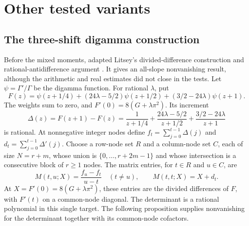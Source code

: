 \section{Other tested variants}\label{sec:variants}

\subsection{The three-shift digamma construction}

Before the mixed moments,  adapted Litsey's divided-difference
construction and rational-antidifference argument
\cite[Sections~3--6]{Litsey}. It gives an all-slope nonvanishing result,
although the arithmetic and real estimates did not close in the tests.
Let $\psi=\Gamma'/\Gamma$ be the digamma function. For rational
$\lambda$, put
\[
 F(z)=\psi(z+1/4)+(24\lambda-5/2)\psi(z+1/2)
                       +(3/2-24\lambda)\psi(z+1).
\]
The weights sum to zero, and $F'(0)=8(G+\lambda\pi^2)$. Its increment
\[
 \Delta(z)=F(z+1)-F(z)=\frac1{z+1/4}
 +\frac{24\lambda-5/2}{z+1/2}+
 \frac{3/2-24\lambda}{z+1}
\]
is rational. At nonnegative integer nodes define
$f_t=\sum_{j=0}^{t-1}\Delta(j)$ and
$d_t=\sum_{j=0}^{t-1}\Delta'(j)$. Choose a row-node set $R$ and a
column-node set $C$, each of size $N=r+m$, whose union is
$\{0,\ldots,r+2m-1\}$ and whose intersection is a consecutive block
of $r\ge1$ nodes. The matrix entries, for $t\in R$ and $u\in C$, are
\[
 M(t,u;X)=\frac{f_u-f_t}{u-t}\quad(t\ne u),\qquad
 M(t,t;X)=X+d_t.
\]
At $X=F'(0)=8(G+\lambda\pi^2)$, these entries are the divided
differences of $F$, with $F'(t)$ on a common-node diagonal.
The determinant is a rational polynomial in this single target.
The following proposition supplies nonvanishing for the determinant
together with its common-node cofactors.

